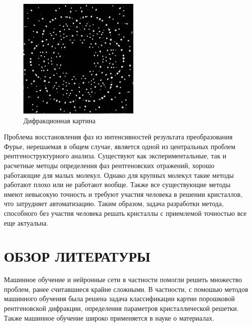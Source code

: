 \documentclass{article}
\begin{document}
\begin{figure}[!htp]
  \includegraphics[width=\linewidth]{imgs/difr.jpeg}
  \caption{Дифракционная картина}
  \label{img:difr}
\end{figure}

Проблема восстановления фаз из интенсивностей результата преобразования Фурье, нерешаемая в общем случае, является одной из центральных проблем рентгеноструктурного анализа. Существуют как экспериментальные, так и расчетные методы определения фаз рентгеновских отражений, хорошо работающие для малых молекул. Однако для крупных молекул такие методы работают плохо или не работают вообще\cite{PhaseProblem}. Также все существующие методы имеют невысокую точность и требуют участия человека в решении кристаллов, что затрудняет автоматизацию. Таким образом, задача разработки метода, способного без участия человека решать кристаллы с приемлемой точностью все еще актуальна. 

\section{ОБЗОР ЛИТЕРАТУРЫ}

Машинное обучение и нейронные сети в частности помогли решить множество проблем, ранее считавшиеся крайне сложными. В частности, с помошью методов машинного обучения была решена \cite{XRD-NN} задача классификации картин порошковой рентгеновской дифракции, определения параметров кристаллической решетки\cite{MCMC}. Также машинное обучение широко применяется в науке о материалах\cite{ML-mat}.
\end{document}
